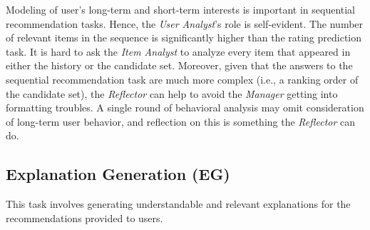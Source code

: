 Modeling of user's long-term and short-term interests is important in sequential recommendation tasks.
Hence, the \textsl{User Analyst}'s role is self-evident.
The number of relevant items in the sequence is significantly higher than the rating prediction task.
It is hard to ask the \textsl{Item Analyst} to analyze every item that appeared in either the history or the candidate set.
Moreover, given that the answers to the sequential recommendation task are much more complex (i.e., a ranking order of the candidate set), the \textsl{Reflector} can help to avoid the \textsl{Manager} getting into formatting troubles.
A single round of behavioral analysis may omit consideration of long-term user behavior, and reflection on this is something the \textsl{Reflector} can do.


\subsection{Explanation Generation (EG)}
This task involves generating understandable and relevant explanations for the recommendations provided to users.

